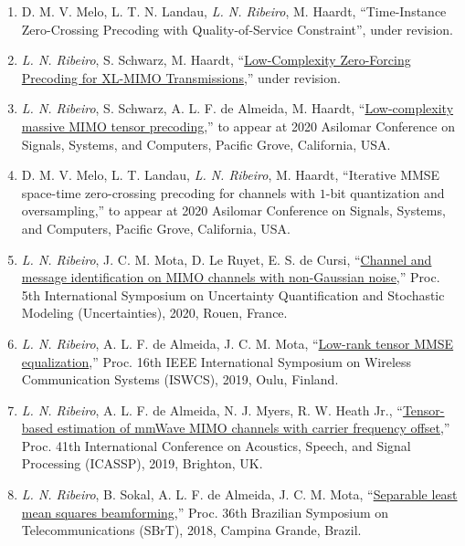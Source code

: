 \begin{enumerate}
	\item D. M. V. Melo, L. T. N. Landau, \emph{L. N. Ribeiro}, M. Haardt, ``Time-Instance Zero-Crossing Precoding with Quality-of-Service Constraint'', under revision.

	\item \emph{L. N. Ribeiro}, S. Schwarz, M. Haardt, ``\href{https://arxiv.org/abs/2103.00971}{Low-Complexity Zero-Forcing Precoding for XL-MIMO Transmissions},'' under revision.

	\item \emph{L. N. Ribeiro}, S. Schwarz, A. L. F. de Almeida, M. Haardt, ``\href{https://arxiv.org/abs/2009.09729}{Low-complexity massive MIMO tensor precoding},'' to appear at 2020 Asilomar Conference on Signals, Systems, and Computers, Pacific Grove, California, USA.

	\item D. M. V. Melo, L. T. Landau, \emph{L. N. Ribeiro}, M. Haardt, ``Iterative MMSE space-time zero-crossing precoding for channels with $1$-bit quantization and oversampling,'' to appear at 2020 Asilomar Conference on Signals, Systems, and Computers, Pacific Grove, California, USA.

	\item \emph{L. N. Ribeiro}, J. C. M. Mota, D. Le Ruyet, E. S. de Cursi, ``\href{https://www5.tu-ilmenau.de/nt/generic/paper_pdfs/Ribeiro2020.pdf}{Channel and message identification on MIMO channels with non-Gaussian noise},'' Proc. 5th International Symposium on Uncertainty Quantification and Stochastic Modeling (Uncertainties), 2020, Rouen, France.
	
	\item \emph{L. N. Ribeiro}, A. L. F. de Almeida, J. C. M. Mota, ``\href{https://arxiv.org/abs/1912.08317}{Low-rank tensor MMSE equalization},'' Proc. 16th IEEE International Symposium on Wireless Communication Systems (ISWCS), 2019, Oulu, Finland.
	
	\item \emph{L. N. Ribeiro}, A. L. F. de Almeida, N. J. Myers, R. W. Heath Jr., ``\href{https://doi.org/10.1109/ICASSP.2019.8683496}{Tensor-based estimation of mmWave MIMO channels with carrier frequency offset},'' Proc. 41th International Conference on Acoustics, Speech, and Signal Processing (ICASSP), 2019, Brighton, UK.
	
	\item \emph{L. N. Ribeiro}, B. Sokal, A. L. F. de Almeida, J. C. M. Mota, ``\href{https://github.com/lnribeiro/lnribeiro.github.io/blob/master/assets/pdf/sbrt18.pdf}{Separable least mean squares beamforming},'' Proc. 36th Brazilian Symposium on Telecommunications (SBrT), 2018, Campina Grande, Brazil.
	

\end{enumerate}

